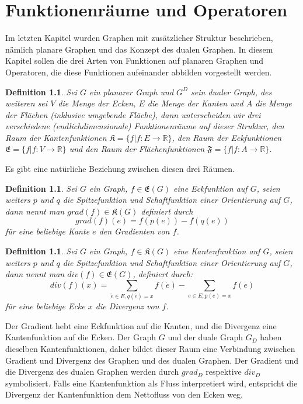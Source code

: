 \documentclass[11pt,a4paper,leqno]{report}
\newtheorem{definition}[theorem]{Definition}
\numberwithin{equation}{chapter}
\begin{document}
\chapter{Funktionenr\"aume und Operatoren}
Im letzten Kapitel wurden Graphen mit zus\"atzlicher Struktur beschrieben, nämlich planare Graphen und das Konzept des dualen Graphen. In diesem Kapitel sollen die drei Arten von Funktionen auf planaren Graphen und Operatoren, die diese Funktionen aufeinander abbilden vorgestellt werden.
\begin{definition}
	Sei $G$ ein planarer Graph und $G^D$ sein dualer Graph, des weiteren sei $V$ die Menge der Ecken, $E$ die Menge der Kanten und $A$ die Menge der Fl\"achen (inklusive umgebende Fl\"ache), dann unterscheiden wir drei verschiedene (endlichdimensionale) Funktionenr\"aume auf dieser Struktur, den Raum der Kantenfunktionen $\mathfrak{K}=\{f|f: E\rightarrow\mathbb{R}\}$, den Raum der Eckfunktionen $\mathfrak{E}=\{f|f: V\rightarrow\mathbb{R}\}$ und den Raum der Fl\"achenfunktionen $\mathfrak{F}=\{f|f: A\rightarrow\mathbb{R}\}$.
\end{definition}
\noindent
Es gibt eine nat\"urliche Beziehung zwischen diesen drei R\"aumen. 
\begin{definition}
	Sei $G$ ein Graph, $f\in\mathfrak{E}(G)$ eine Eckfunktion auf $G$, seien weiters $p$ und $q$ die Spitzefunktion und Schaftfunktion einer Orientierung auf $G$, dann nennt man $grad(f)\in\mathfrak{K}(G)$ definiert durch 
	$$grad(f)(e) = f(p(e)) - f(q(e))$$ 
	f\"ur eine beliebige Kante $e$ den Gradienten von $f$.
\end{definition}
\begin{definition}
	Sei $G$ ein Graph, $f\in\mathfrak{K}(G)$ eine Kantenfunktion auf $G$, seien weiters $p$ und $q$ die Spitzefunktion und Schaftfunktion einer Orientierung auf $G$, dann nennt man $div(f)\in\mathfrak{E}(G)$, definiert durch: 
	$$div(f)(x) = \sum_{\acute{e}\in E, q(\acute{e})=x}f(\acute{e}) -\sum_{e\in E, p(e)=x}f(e)$$
	f\"ur eine beliebige Ecke $x$ die Divergenz von $f$.
\end{definition}
\noindent
	Der Gradient hebt eine Eckfunktion auf die Kanten, und die Divergenz eine Kantenfunktion auf die Ecken. Der Graph $G$ und der duale Graph $G_D$ haben dieselben  Kantenfunktionen, daher bildet dieser Raum eine Verbindung zwischen Gradient und Divergenz des Graphen und des dualen Graphen. Der Gradient und die Divergenz des dualen Graphen werden durch $grad_D$ respektive $div_D$ symbolisiert. Falls eine Kantenfunktion als Fluss interpretiert wird, entspricht die Divergenz der Kantenfunktion dem Nettofluss von den Ecken weg.
\end{document}
